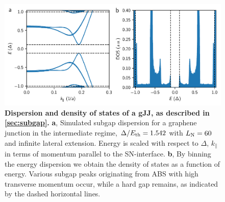 \documentclass[preprint,
  onecolumn,
  notitlepage,
  amsmath,amssymb,
  aip,
  apl,
]{revtex4-1}
\begin{document}
\begin{figure}[]
    \centering
    \includegraphics[width=\linewidth]{figs/si_subgap_dos}
    \caption{{\bf Dispersion and density of states of a gJJ, as described in \ref{sec:subgap}.}
        {\bf a}, Simulated subgap dispersion for a graphene junction in the intermediate regime, $\Delta/E_{\rm th}=1.542$ with $L_{\rm N}=60$ and infinite lateral extension.
        Energy is scaled with respect to $\Delta$, $k_\parallel$ in terms of momentum parallel to the SN-interface.
        {\bf b}, By binning the energy dispersion we obtain the density of states as a function of energy.
        Various subgap peaks originating from ABS with high transverse momentum occur, while a hard gap remains, as indicated by the dashed horizontal lines.
    }
    \label{fig:subgap_dos}
\end{figure}
\end{document}
